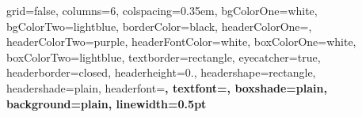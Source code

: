 \documentclass[a0paper,fontscale=0.265]{baposter} %
\begin{document}
\begin{poster}%
  {
  grid=false,
  columns=6,
  colspacing=0.35em,
  bgColorOne=white,
  bgColorTwo=lightblue,
  borderColor=black,
  headerColorOne=\maincolor,
  headerColorTwo=purple,
  headerFontColor=white,
  boxColorOne=white,
  boxColorTwo=lightblue,
  textborder=rectangle,
  eyecatcher=true,
  headerborder=closed,
  headerheight=0.\textheight,
  headershape=rectangle,
  headershade=plain,
  headerfont=\Large\fontfamily{\sfdefault}\bfseries, %
  textfont={\setlength{\parindent}{1.5em}},
  boxshade=plain,
  background=plain,
  linewidth=0.5pt
  }
  {
  }
  {
  }
  {
  }
  {%
  }


\end{poster}
\end{document}
